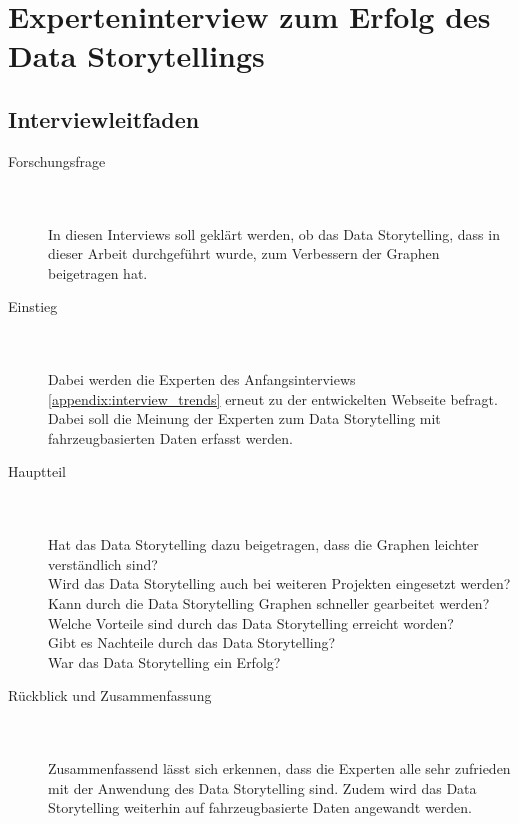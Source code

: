 \chapter{Experteninterview zum Erfolg des Data Storytellings}
\section{Interviewleitfaden}
\label{appendix:interview_ende}
\begin{description}
\item[Forschungsfrage]\hfill \\\\
In diesen Interviews soll geklärt werden, ob das Data Storytelling, dass in dieser Arbeit durchgeführt wurde, zum Verbessern der Graphen beigetragen hat.\\
\item[Einstieg]\hfill \\\\
Dabei werden die Experten des Anfangsinterviews \ref{appendix:interview_trends} erneut zu der entwickelten Webseite befragt. Dabei soll die Meinung der Experten zum Data Storytelling mit fahrzeugbasierten Daten erfasst werden.\\
\item[Hauptteil]\hfill \\\\
Hat das Data Storytelling dazu beigetragen, dass die Graphen leichter verständlich sind?\\
Wird das Data Storytelling auch bei weiteren Projekten eingesetzt werden?\\
Kann durch die Data Storytelling Graphen schneller gearbeitet werden?\\
Welche Vorteile sind durch das Data Storytelling erreicht worden?\\
Gibt es Nachteile durch das Data Storytelling?\\
War das Data Storytelling ein Erfolg?
\item[Rückblick und Zusammenfassung]\hfill \\\\
Zusammenfassend lässt sich erkennen, dass die Experten alle sehr zufrieden mit der Anwendung des Data Storytelling sind. Zudem wird das Data Storytelling weiterhin auf fahrzeugbasierte Daten angewandt werden.
\end{description}